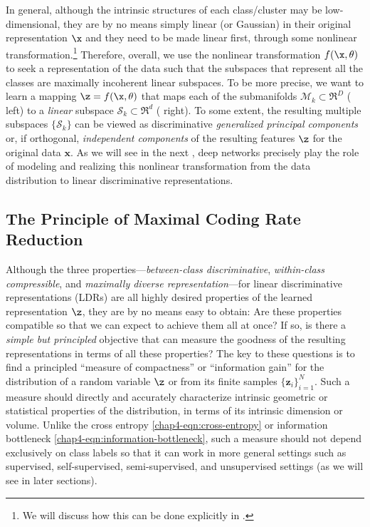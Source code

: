 \documentclass[../../book-main.tex]{subfiles}
\begin{document}
In general, although the intrinsic structures of each class/cluster may be low-dimensional, they are by no means simply linear (or Gaussian) in their original representation $\x$ and they need to be made linear first, through some nonlinear transformation.\footnote{We will discuss how this can be done explicitly in .} Therefore, overall, we use the nonlinear transformation $f(\x,\theta)$ to seek a representation of the data such that the subspaces that represent all the classes are maximally incoherent linear subspaces. To be more precise, we want to learn a mapping {$\z = f(\x,\theta)$} that maps each of the submanifolds $\mathcal{M}_k \subset \Re^D$ ( left) to a {\em linear} subspace $\mathcal{S}_k \subset \Re^d$ ( right). To some extent, the resulting multiple subspaces $\{\mathcal{S}_k\}$ can be viewed as discriminative {\em generalized principal components} \cite{GPCA} or, if orthogonal, {\em independent components} \cite{hyvarinen2000independent} of the resulting features $\z$ for the original data $\bm x$.
As we will see in the next , deep networks precisely play the role of modeling and realizing this nonlinear transformation from the data distribution to linear discriminative representations.


\subsection{The Principle of Maximal Coding Rate Reduction}\label{subsec:MCR2}





Although the three properties---{\em between-class discriminative}, {\em
within-class compressible}, and {\em maximally diverse representation}---for linear discriminative representations (LDRs) are all highly desired properties  of the learned representation $\z$, they are by no means easy to obtain: Are these properties compatible so that we can expect to achieve them all at once? If so, is there a {\em simple but principled} objective that can measure the goodness of the resulting representations in terms of all these properties? The key to these questions {is to find} a principled ``measure of compactness'' or ``information gain''  for the distribution of a random variable $\z$ or from its finite samples $\{\bm z_i\}_{i=1}^N$. Such a measure should directly and accurately characterize intrinsic geometric or statistical properties of the distribution, in terms of its intrinsic dimension or {volume}. Unlike the cross entropy \eqref{chap4-eqn:cross-entropy} or information bottleneck \eqref{chap4-eqn:information-bottleneck}, such a measure should not depend exclusively on class labels so that it can work in more general settings such as supervised, self-supervised, semi-supervised, and unsupervised settings (as we will see in later sections).
\end{document}
